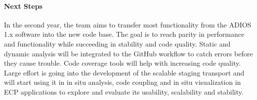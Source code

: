 \paragraph{Next Steps}
In the second year, the team aims to transfer most functionality from the  ADIOS 1.x software into the new code base.  The goal is to reach parity in performance and functionality while succeeding in stability and code quality. Static and dynamic analysis will be integrated to the GitHub workflow to catch errors before they cause trouble. Code coverage tools will help with increasing code quality. Large effort is going into the development of the scalable staging transport and will start using it in in situ analysis, code coupling and in situ visualization in ECP applications to explore and evaluate its usability, scalability and stability. 
